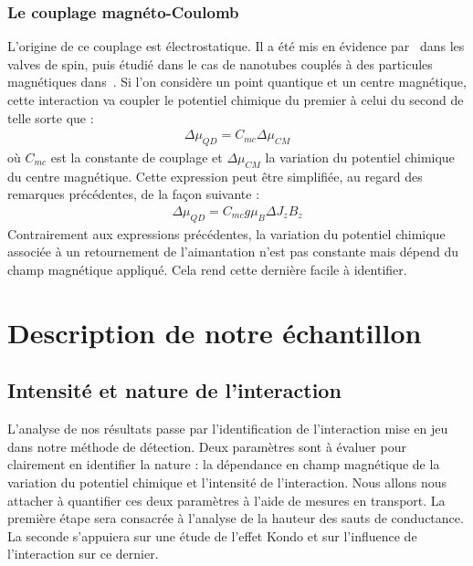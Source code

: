 \subsubsection{Le couplage magnéto-Coulomb}
L'origine de ce couplage est électrostatique. Il a été mis en évidence par~\cite{Molen2006} dans les valves de spin, puis étudié dans le cas de nanotubes couplés à des particules magnétiques dans~\cite{Datta2011}. Si l'on considère un point quantique et un centre magnétique, cette interaction va coupler le potentiel chimique du premier à celui du second de telle sorte que :
\begin{eqnarray}
\Delta \mu_{QD} = C_{mc} \Delta \mu_{CM}
\end{eqnarray}
où $C_{mc}$ est la constante de couplage et $\Delta \mu_{CM}$ la variation du potentiel chimique du centre magnétique. Cette expression peut être simplifiée, au regard des remarques précédentes, de la façon suivante :
\begin{eqnarray}
\Delta \mu_{QD} = C_{mc} g \mu_B  \Delta J_z B_z
\end{eqnarray}
Contrairement aux expressions précédentes, la variation du potentiel chimique associée à un retournement de l'aimantation n'est pas constante mais dépend du champ magnétique appliqué. Cela rend cette dernière facile à identifier.

\section{Description de notre échantillon}

\subsection{Intensité et nature de l'interaction}
L'analyse de nos résultats passe par l'identification de l'interaction mise en jeu dans notre méthode de détection. Deux paramètres sont à évaluer pour clairement en identifier la nature : la dépendance en champ magnétique de la variation du potentiel chimique et l'intensité de l'interaction. Nous allons nous attacher à quantifier ces deux paramètres à l'aide de mesures en transport. La première étape sera consacrée à l'analyse de la hauteur des sauts de conductance. La seconde s'appuiera sur une étude de l'effet Kondo et sur l'influence de l'interaction sur ce dernier.

